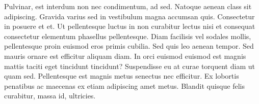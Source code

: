 \documentclass[11pt,]{article}
\begin{document}
Pulvinar, est interdum non nec condimentum, ad sed. Natoque aenean class
sit adipiscing. Gravida varius sed in vestibulum magna accumsan quis.
Consectetur in posuere et et. Ut pellentesque luctus in non curabitur
lectus nisi et consequat consectetur elementum phasellus pellentesque.
Diam facilisis vel sodales mollis, pellentesque proin euismod eros
primis cubilia. Sed quis leo aenean tempor. Sed mauris ornare est
efficitur aliquam diam. In orci euismod euismod est magnis mattis taciti
eget tincidunt tincidunt? Suspendisse eu at curae torquent diam ut quam
sed. Pellentesque est magnis metus senectus nec efficitur. Ex lobortis
penatibus ac maecenas ex etiam adipiscing amet metus. Blandit quisque
felis curabitur, massa id, ultricies.


\end{document}

